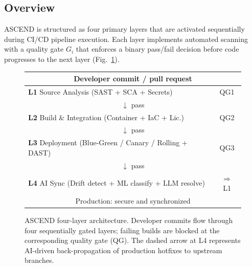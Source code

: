 \documentclass{ieeeaccess}
\begin{document}
\subsection{Overview}
ASCEND is structured as four primary layers that are activated sequentially during CI/CD pipeline execution. Each layer implements automated scanning with a quality gate $G_i$ that enforces a binary pass/fail decision before code progresses to the next layer (Fig.~\ref{fig:arch}).

\begin{figure}[!t]
\centering
\setlength{\tabcolsep}{4pt}
\renewcommand{\arraystretch}{1.15}
\begin{tabular}{|c|c|}
\hline
\multicolumn{2}{|c|}{\footnotesize Developer commit / pull request} \\
\hline
\multicolumn{1}{|l|}{\textbf{L1} Source Analysis (SAST + SCA + Secrets)} & \footnotesize QG1 \\
\hline
\multicolumn{2}{|c|}{$\downarrow$ pass} \\
\hline
\multicolumn{1}{|l|}{\textbf{L2} Build \& Integration (Container + IaC + Lic.)} & \footnotesize QG2 \\
\hline
\multicolumn{2}{|c|}{$\downarrow$ pass} \\
\hline
\multicolumn{1}{|l|}{\textbf{L3} Deployment (Blue-Green / Canary / Rolling + DAST)} & \footnotesize QG3 \\
\hline
\multicolumn{2}{|c|}{$\downarrow$ pass} \\
\hline
\multicolumn{1}{|l|}{\textbf{L4} AI Sync (Drift detect + ML classify + LLM resolve)} & \footnotesize $\Rightarrow$ L1 \\
\hline
\multicolumn{2}{|c|}{\footnotesize Production: secure and synchronized} \\
\hline
\end{tabular}
\caption{ASCEND four-layer architecture. Developer commits flow through four sequentially gated layers; failing builds are blocked at the corresponding quality gate (QG). The dashed arrow at L4 represents AI-driven back-propagation of production hotfixes to upstream branches.}
\label{fig:arch}
\end{figure}
\end{document}
